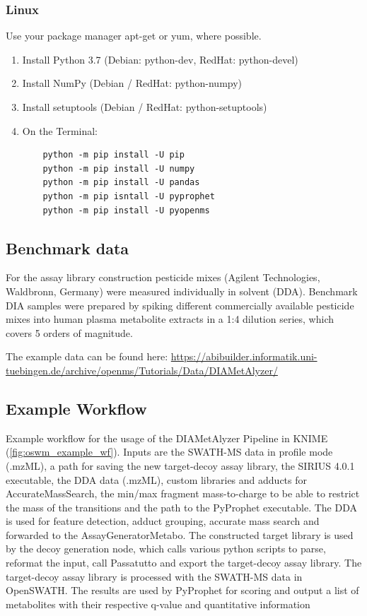 \subsubsection{Linux}
Use your package manager apt-get or yum, where possible.
\begin{enumerate}
  \item Install Python 3.7 (Debian: python-dev, RedHat: python-devel)
  \item Install NumPy (Debian / RedHat: python-numpy)
  \item Install setuptools (Debian / RedHat: python-setuptools)
  \item On the Terminal:
    \begin{lstlisting}
    python -m pip install -U pip
    python -m pip install -U numpy
    python -m pip install -U pandas
    python -m pip isntall -U pyprophet
    python -m pip install -U pyopenms
    \end{lstlisting}
\end{enumerate}

\subsection{Benchmark data}
For the assay library construction pesticide mixes (Agilent Technologies, Waldbronn, Germany) were measured individually in solvent (DDA). 
Benchmark DIA samples were prepared by spiking different commercially available pesticide mixes into human plasma metabolite extracts in a 1:4 dilution series, which covers 5 orders of magnitude.

\noindent The example data can be found here:
\url{https://abibuilder.informatik.uni-tuebingen.de/archive/openms/Tutorials/Data/DIAMetAlyzer/}

\subsection{Example Workflow}
Example workflow for the usage of the DIAMetAlyzer Pipeline in KNIME (\ref{fig:oswm_example_wf}). Inputs are the SWATH-MS data in profile mode (.mzML), a path for saving the new target-decoy assay library, the SIRIUS 4.0.1 executable, the DDA data (.mzML), custom libraries and adducts for AccurateMassSearch, the min/max fragment mass-to-charge to be able to restrict the mass of the transitions and the path to the PyProphet executable. The DDA is used for feature detection, adduct grouping, accurate mass search and forwarded to the AssayGeneratorMetabo. The constructed target library is used by the decoy generation node, which calls various python scripts to parse, reformat the input, call Passatutto and export the target-decoy assay library. The target-decoy assay library is processed with the SWATH-MS data in OpenSWATH. The results are used by PyProphet for scoring and output a list of metabolites with their respective q-value and quantitative information

